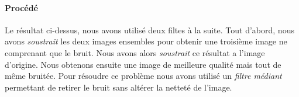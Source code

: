 	\paragraph{Procédé}	
		Le résultat ci-dessus, nous avons utilisé deux filtes à la suite. Tout d'abord, nous avons \emph{soustrait} les deux images ensembles pour obtenir une troisième image ne comprenant que le bruit. Nous avons alors \emph{soustrait} ce résultat a l'image d'origine. Nous obtenons ensuite une image de meilleure qualité mais tout de même bruitée. Pour résoudre ce problème nous avons utilisé un \emph{filtre médiant} permettant de retirer le bruit sans altérer la netteté de l'image.